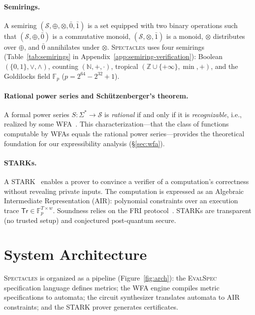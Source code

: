 \documentclass[11pt]{article}
\newcommand{\spectacles}{\textsc{Spectacles}}
\newcommand{\evalspec}{\textsc{EvalSpec}}
\newcommand{\N}{\mathbb{N}}
\newcommand{\Z}{\mathbb{Z}}
\newcommand{\F}{\mathbb{F}}
\newcommand{\semiring}[1]{\mathcal{#1}}
\newcommand{\Tr}{\textsf{Tr}}
\begin{document}
\paragraph{Semirings.}
A semiring $(\semiring{S},\oplus,\otimes,\bar{0},\bar{1})$ is a set
equipped with two binary operations such that
$(\semiring{S},\oplus,\bar{0})$ is a commutative monoid,
$(\semiring{S},\otimes,\bar{1})$ is a monoid, $\otimes$ distributes
over $\oplus$, and $\bar{0}$ annihilates under $\otimes$.
\spectacles{} uses four semirings (Table~\ref{tab:semirings} in
Appendix~\ref{app:semiring-verification}):
Boolean $(\{0,1\},\lor,\land)$,
counting $(\N,+,\cdot)$,
tropical $(\Z\cup\{+\infty\},\min,+)$, and
the Goldilocks field $\F_p$ ($p=2^{64}-2^{32}+1$).

\paragraph{Rational power series and Sch\"utzenberger's theorem.}
A formal power series $S:\Sigma^*\to\semiring{S}$ is \emph{rational}
if and only if it is \emph{recognizable}, i.e., realized by some
WFA~\cite{schutzenberger1961,berstel2011noncommutative}.  This
characterization---that the class of functions computable by WFAs equals
the rational power series---provides the theoretical foundation for our
expressibility analysis (\S\ref{sec:wfa}).

\paragraph{STARKs.}
A STARK~\cite{bensasson2018stark} enables a prover to convince a verifier
of a computation's correctness without revealing private inputs.  The
computation is expressed as an Algebraic Intermediate Representation
(AIR): polynomial constraints over an execution trace
$\Tr \in \F_p^{T \times w}$.  Soundness relies on the
FRI protocol~\cite{bensasson2018fri}.  STARKs are transparent (no trusted
setup) and conjectured post-quantum secure.


\section{System Architecture}\label{sec:arch}

\spectacles{} is organized as a pipeline
(Figure~\ref{fig:arch}):
the \evalspec{} specification language defines metrics;
the WFA engine compiles metric specifications to automata;
the circuit synthesizer translates automata to AIR constraints;
and the STARK prover generates certificates.
\end{document}
